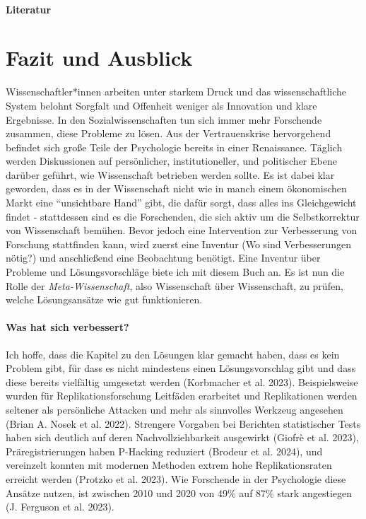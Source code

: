 \documentclass[
  letterpaper,
  DIV=11,
  numbers=noendperiod]{scrreprt}
\begin{document}
\subsection{Literatur}\label{literatur-16}

\part{Fazit und Ausblick}

Wissenschaftler*innen arbeiten unter starkem Druck und das
wissenschaftliche System belohnt Sorgfalt und Offenheit weniger als
Innovation und klare Ergebnisse. In den Sozialwissenschaften tun sich
immer mehr Forschende zusammen, diese Probleme zu lösen. Aus der
Vertrauenskrise hervorgehend befindet sich große Teile der Psychologie
bereits in einer Renaissance. Täglich werden Diskussionen auf
persönlicher, institutioneller, und politischer Ebene darüber geführt,
wie Wissenschaft betrieben werden sollte. Es ist dabei klar geworden,
dass es in der Wissenschaft nicht wie in manch einem ökonomischen Markt
eine ``unsichtbare Hand'' gibt, die dafür sorgt, dass alles ins
Gleichgewicht findet - stattdessen sind es die Forschenden, die sich
aktiv um die Selbstkorrektur von Wissenschaft bemühen. Bevor jedoch eine
Intervention zur Verbesserung von Forschung stattfinden kann, wird
zuerst eine Inventur (Wo sind Verbesserungen nötig?) und anschließend
eine Beobachtung benötigt. Eine Inventur über Probleme und
Lösungsvorschläge biete ich mit diesem Buch an. Es ist nun die Rolle der
\emph{Meta-Wissenschaft}, also Wissenschaft über Wissenschaft, zu
prüfen, welche Lösungsansätze wie gut funktionieren.

\subsection*{Was hat sich verbessert?}\label{was-hat-sich-verbessert}

Ich hoffe, dass die Kapitel zu den Lösungen klar gemacht haben, dass es
kein Problem gibt, für dass es nicht mindestens einen Lösungsvorschlag
gibt und dass diese bereits vielfältig umgesetzt werden (Korbmacher et
al. 2023). Beispielsweise wurden für Replikationsforschung Leitfäden
erarbeitet und Replikationen werden seltener als persönliche Attacken
und mehr als sinnvolles Werkzeug angesehen (Brian A. Nosek et al. 2022).
Strengere Vorgaben bei Berichten statistischer Tests haben sich deutlich
auf deren Nachvollziehbarkeit ausgewirkt (Giofrè et al. 2023),
Präregistrierungen haben P-Hacking reduziert (Brodeur et al. 2024), und
vereinzelt konnten mit modernen Methoden extrem hohe Replikationsraten
erreicht werden (Protzko et al. 2023). Wie Forschende in der Psychologie
diese Ansätze nutzen, ist zwischen 2010 und 2020 von 49\% auf 87\% stark
angestiegen (J. Ferguson et al. 2023).
\end{document}
